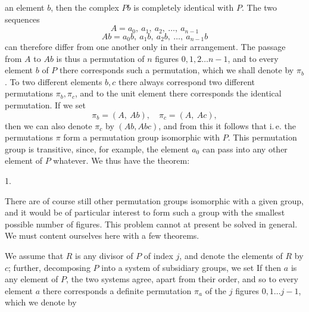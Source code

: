 an element $b$, then the complex $Pb$ is completely identical with $P$. The two sequences
\[
A = a_0,\ a_1,\ a_2,\ \ldots,\ a_{n-1}
\]
\[
Ab = a_0b,\ a_1b,\ a_2b,\ \ldots,\ a_{n-1}b
\]
can therefore differ from one another only in their arrangement. The
passage from $A$ to $Ab$ is thus a permutation of $n$ figures
$0, 1, 2 \ldots n - 1$, and to every element $b$ of $P$ there corresponds such
a permutation, which we shall denote by $\pi_b$. To two different
elements $b, c$ there always correspond two different
permutations $\pi_b, \pi_c$, and to the unit element there corresponds the
identical permutation. If we set
\[
\pi_b = (A,\ Ab), \quad \pi_c = (A,\ Ac),
\]
then we can also denote $\pi_c$ by $(Ab, Abc)$, and from this
it follows that
i.\,e. the permutations $\pi$ form a permutation group isomorphic with $P$. This permutation group is transitive, since, for example,
the element $a_0$ can pass into any other element of $P$ whatever. We thus have the theorem:

1.\ 

There are of course still other permutation groups isomorphic
with a given group, and it would be of particular
interest to form such a group with the smallest possible number of figures.
This problem cannot at present be solved in general.
We must content ourselves here with a few theorems.

We assume that $R$ is any divisor of $P$ of
index $j$, and denote the elements of $R$ by $c$; further, decomposing
$P$ into a system of subsidiary groups, we set
If then $a$ is any element of $P$, the two
systems
agree, apart from their order, and so to every element $a$ there corresponds a definite permutation $\pi_a$ of the
$j$ figures $0, 1 \ldots j - 1$, which we denote by
